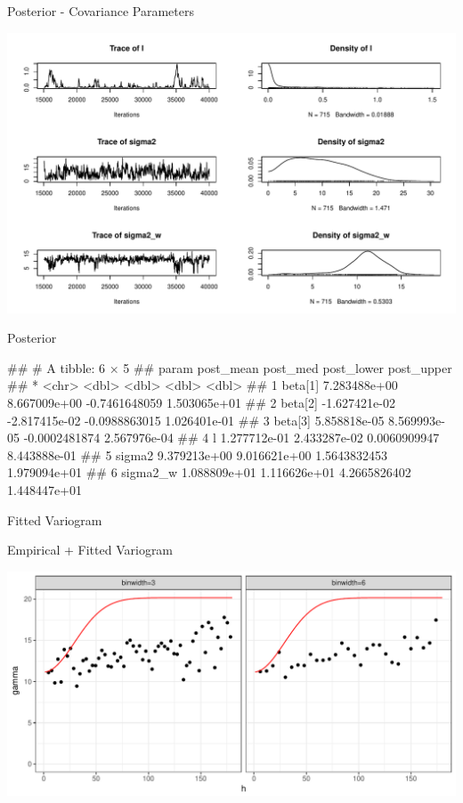 \documentclass[11pt,ignorenonframetext,]{beamer}
\let\oldverbatim\verbatim
\let\endoldverbatim\endverbatim
\renewenvironment{verbatim}{\footnotesize\begin{spacing}{0.9}\oldverbatim}{\endoldverbatim\end{spacing}}
\begin{document}
\begin{frame}{Posterior - Covariance Parameters}

\includegraphics{Lec13_files/figure-beamer/unnamed-chunk-19-1.pdf}

\end{frame}

\begin{frame}[fragile]{Posterior}

\begin{verbatim}
## # A tibble: 6 × 5
##      param     post_mean      post_med    post_lower   post_upper
## *    <chr>         <dbl>         <dbl>         <dbl>        <dbl>
## 1  beta[1]  7.283488e+00  8.667009e+00 -0.7461648059 1.503065e+01
## 2  beta[2] -1.627421e-02 -2.817415e-02 -0.0988863015 1.026401e-01
## 3  beta[3]  5.858818e-05  8.569993e-05 -0.0002481874 2.567976e-04
## 4        l  1.277712e-01  2.433287e-02  0.0060909947 8.443888e-01
## 5   sigma2  9.379213e+00  9.016621e+00  1.5643832453 1.979094e+01
## 6 sigma2_w  1.088809e+01  1.116626e+01  4.2665826402 1.448447e+01
\end{verbatim}

\end{frame}

\begin{frame}{Fitted Variogram}

\end{frame}

\begin{frame}{Empirical + Fitted Variogram}

\includegraphics{Lec13_files/figure-beamer/unnamed-chunk-21-1.pdf}

\end{frame}
\end{document}
